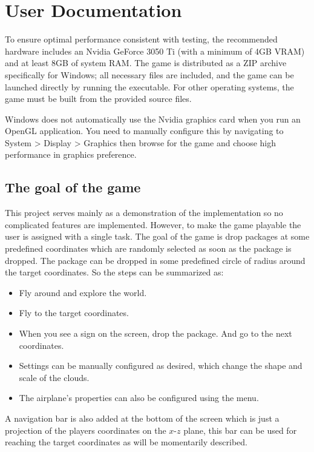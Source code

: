\chapter{User Documentation}
\label{ch:user}

To ensure optimal performance consistent with testing, the recommended hardware includes an Nvidia GeForce 3050 Ti (with a minimum of 4GB VRAM) and at least 8GB of system RAM. The game is distributed as a ZIP archive specifically for Windows; all necessary files are included, and the game can be launched directly by running the executable. For other operating systems, the game must be built from the provided source files.

Windows does not automatically use the Nvidia graphics card when you run an OpenGL application. You need to manually configure this by navigating to System > Display > Graphics then browse for the game and choose high performance in graphics preference.

\section{The goal of the game}

This project serves mainly as a demonstration of the implementation so no complicated features are implemented. However, to make the game playable the user is assigned with a single task. The goal of the game is drop packages at some predefined coordinates which are randomly selected as soon as the package is dropped. The package can be dropped in some predefined circle of radius around the target coordinates. So the steps can be summarized as: 

\begin{itemize}
	\item Fly around and explore the world.
	\item Fly to the target coordinates.
	\item When you see a sign on the screen, drop the package. And go to the next coordinates.
	\item Settings can be manually configured as desired, which change the shape and scale of the clouds.
	\item The airplane's properties can also be configured using the menu.
\end{itemize}

A navigation bar is also added at the bottom of the screen which is just a projection of the players coordinates on the $x$-$z$ plane, this bar can be used for reaching the target coordinates as will be momentarily described.

